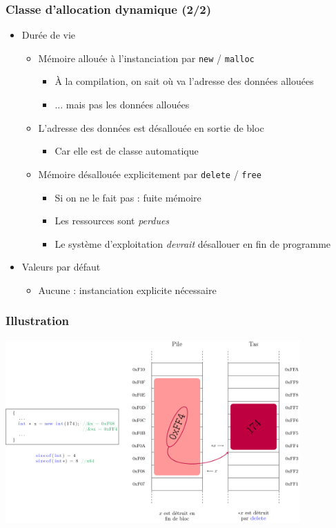 \begin{frame}
\frametitle{Classe d'allocation dynamique (2/2)}
\begin{itemize}[<+->]
\item Durée de vie
	\begin{itemize}
	\item Mémoire allouée à l'instanciation par \lstinline|new| / \texttt{malloc}
		\begin{itemize}
		\item À la compilation, on sait où va l'adresse des données allouées
		\item ... mais pas les données allouées
		\end{itemize}
	\item L'adresse des données est désallouée en sortie de bloc
		\begin{itemize}
		\item Car elle est de classe automatique
		\end{itemize}
	\item Mémoire désallouée explicitement par \lstinline|delete| / \texttt{free}
		\begin{itemize}
		\item Si on ne le fait pas : fuite mémoire
		\item Les ressources sont \emph{perdues}
		\item Le système d'exploitation \emph{devrait} désallouer en fin de programme
		\end{itemize}
	\end{itemize}
\item Valeurs par défaut
	\begin{itemize}
	\item Aucune : instanciation explicite nécessaire
	\end{itemize}
\end{itemize}
\end{frame}

\begin{frame}
\frametitle{Illustration}
\begin{center}
\includegraphics[height=7cm]{pics/dynamic.pdf}
\end{center}
\end{frame}

